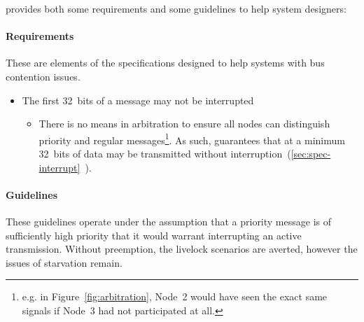 \bus provides both some requirements and some guidelines to help system
designers:

\paragraph{Requirements} These are elements of the \bus specifications
designed to help systems with bus contention issues.

\begin{itemize}
  \item{The first 32~bits of a message may not be interrupted}
  \begin{itemize}
    \item There is no means in \bus arbitration to ensure all nodes can
          distinguish priority and regular messages\footnote{
            e.g. in Figure~\ref{fig:arbitration}, Node~2 would have seen the
            exact same signals if Node~3 had not participated at all.}.
          As such, \bus guarantees that at a minimum 32~bits of data may be
          transmitted without
          interruption~(\ref{sec:spec-interrupt}~).
  \end{itemize}
\end{itemize}

\paragraph{Guidelines}
These guidelines operate under the assumption that a priority message is of
sufficiently high priority that it would warrant interrupting an active
transmission. Without preemption, the livelock scenarios are averted, however
the issues of starvation remain.

